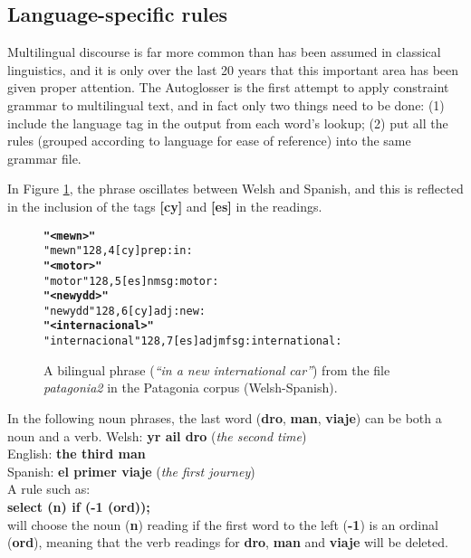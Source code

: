 \documentclass[11pt]{article}
\begin{document}
\subsection{Language-specific rules}
\label{sec:langspec}

Multilingual discourse is far more common than has been assumed in classical linguistics, and it is only over the last 20 years that this important area has been given proper attention.  The Autoglosser is the first attempt to apply constraint grammar to multilingual text, and in fact only two things need to be done: (1) include the language tag in the output from each word's lookup; (2) put all the rules (grouped according to language for ease of reference) into the same grammar file. 

In Figure \ref{bilingual}, the phrase oscillates between Welsh and Spanish, and this is reflected in the inclusion of the tags \textbf{[cy]} and \textbf{[es]} in the readings.

\begin{figure}[!hbtp]
\centering
\begin{footnotesize}
\begin{alltt}
\normalfont
\textbf{"<mewn>"}
    "mewn" {128,4} [cy] prep :in:
\textbf{"<motor>"}
    "motor" {128,5} [es] n m sg :motor:
\textbf{"<newydd>"}
    "newydd" {128,6} [cy] adj :new:
\textbf{"<internacional>"}
    "internacional" {128,7} [es] adj mf sg :internat\-ional:
\end{alltt}
\end{footnotesize}
\caption{A bilingual phrase (\textit{``in a new international car''}) from the file \textit{patagonia2} in the Patagonia corpus (Welsh-Spanish).}
\label{bilingual}
\end{figure}

In the following noun phrases, the last word (\textbf{dro}, \textbf{man}, \textbf{viaje}) can be both a noun and a verb.
\indent Welsh: \textbf{yr ail dro} (\textit{the second time}) \\
\indent English: \textbf{the third man} \\
\indent Spanish: \textbf{el primer viaje} (\textit{the first journey}) \\
A rule such as: \\
\indent\textbf{select (n) if (-1 (ord));} \\
will choose the noun (\textbf{n}) reading if the first word to the left (\textbf{-1}) is an ordinal (\textbf{ord}), meaning that the verb readings for \textbf{dro}, \textbf{man} and \textbf{viaje} will be deleted.
\end{document}
